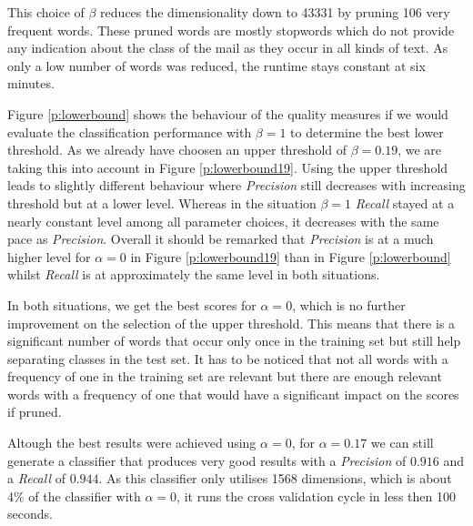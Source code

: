 This choice of $\beta$ reduces the dimensionality down to 43331 by pruning 106 very frequent words.
These pruned words are mostly stopwords which do not provide any indication about the class of the mail as they occur in all kinds of text.
As only a low number of words was reduced, the runtime stays constant at six minutes.



Figure \ref{p:lowerbound} shows the behaviour of the quality measures if we would evaluate the classification performance with $\beta=1$ to determine the best lower threshold.
As we already have choosen an upper threshold of $\beta = 0.19$, we are taking this into account in Figure \ref{p:lowerbound19}.
Using the upper threshold leads to slightly different behaviour where \emph{Precision} still decreases with increasing threshold but at a lower level.
Whereas in the situation $\beta = 1$ \emph{Recall} stayed at a nearly constant level among all parameter choices, it decreases with the same pace as \emph{Precision}.
Overall it should be remarked that \emph{Precision} is at a much higher level for $\alpha = 0$ in Figure \ref{p:lowerbound19} than in Figure \ref{p:lowerbound} whilst \emph{Recall} is at approximately the same level in both situations.

In both situations, we get the best scores for $\alpha=0$, which is no further improvement on the selection of the upper threshold.
This means that there is a significant number of words that occur only once in the training set but still help separating classes in the test set.
It has to be noticed that not all words with a frequency of one in the training set are relevant but there are enough relevant words with a frequency of one that would have a significant impact on the scores if pruned.

Altough the best results were achieved using $\alpha=0$, for $\alpha=0.17$ we can still generate a classifier that produces very good results with a \emph{Precision} of $0.916$ and a \emph{Recall} of $0.944$.
As this classifier only utilises 1568 dimensions, which is about 4\% of the classifier with $\alpha=0$, it runs the cross validation cycle in less then 100 seconds.



% 
